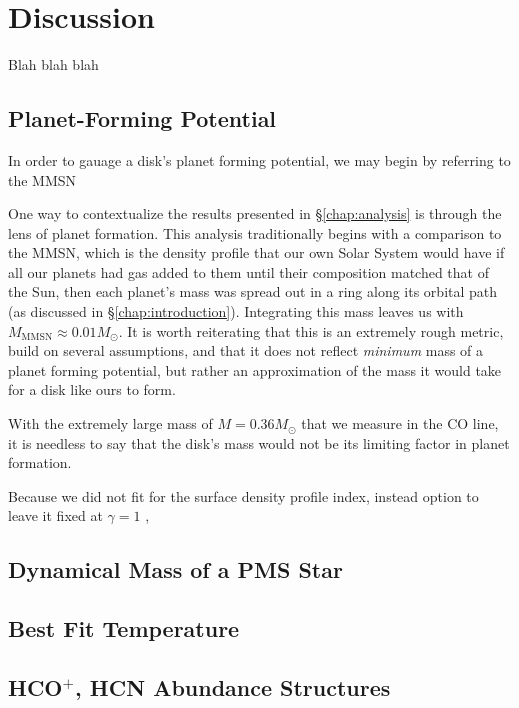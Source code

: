 \chapter{Discussion}
\label{chap:discussion}

Blah blah blah


\section{Planet-Forming Potential}
\label{section:fitting_procedure}

In order to gauage a disk's planet forming potential, we may begin by referring to the MMSN

One way to contextualize the results presented in \S\ref{chap:analysis} is through the lens of planet formation. This analysis traditionally begins with a comparison to the MMSN, which is the density profile that our own Solar System would have if all our planets had gas added to them until their composition matched that of the Sun, then each planet's mass was spread out in a ring along its orbital path (as discussed in \S\ref{chap:introduction}). Integrating this mass leaves us with $M_\text{MMSN} \approx 0.01 M_\odot$. It is worth reiterating that this is an extremely rough metric, build on several assumptions, and that it does not reflect \textit{minimum} mass of a planet forming potential, but rather an approximation of the mass it would take for a disk like ours to form.

With the extremely large mass of $M = 0.36M_\odot$ that we measure in the CO line, it is needless to say that the disk's mass would not be its limiting factor in planet formation.


Because we did not fit for the surface density profile index, instead option to leave it fixed at $\gamma=1$ \citep{Andrews2009},

\section{Dynamical Mass of a PMS Star}
\label{section:fitting_procedure}




\section{Best Fit Temperature }
\label{section:fitting_procedure}








\section{HCO$^+$, HCN Abundance Structures}
\label{section:fitting_procedure}

